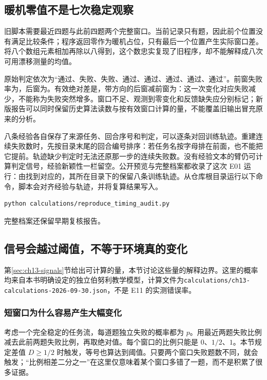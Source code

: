 \subsection{暖机零值不是七次稳定观察}

旧脚本需要最近四题与此前四题两个完整窗口。当前记录只有题，因此前个位置没有满足比较条件；程序返回零作为暖机占位，只有最后一个位置产生实际窗口差。将八个数组元素相加再除以八得到，这个数忠实复现了旧程序，却不能解释成八次可用漂移测量的均值。

原始判定依次为“通过、失败、失败、通过、通过、通过、通过、通过”。前窗失败率为，后窗为。有效绝对差是，带方向的后窗减前窗为：这一次变化对应失败减少，不能称为失败突然增多。窗口不足、观测到零变化和反馈缺失应分别标记；新版报告可以同时保留历史算法读数与按有效窗口计算的量，不能覆盖旧输出冒充原来的分析。

八条经验各自保存了来源任务、回合序号和判定，可以逐条对回训练轨迹。重建连续失败数时，先按目录末尾的回合编号排序：若任务名按字母排在前面，也不能把它提前。轨迹缺少判定时无法还原那一步的连续失败数。没有经验文本的臂仍可计算判定信号，经验新颖性一栏留空。公开预览与完整档案都收录了这次 E01 运行：由找到对应的，其所在目录下的保留八条训练轨迹。从仓库根目录运行以下命令，脚本会对齐经验与轨迹，并将复算结果写入。
\begin{verbatim}
python calculations/reproduce_timing_audit.py
\end{verbatim}
完整档案还保留早期复核报告。

\subsection{信号会越过阈值，不等于环境真的变化}
\label{sec:ch13-signal-noise}

第\ref{sec:ch13-signals}节给出可计算的量，本节讨论这些量的解释边界。这里的概率均来自本书明确设定的独立伯努利教学模型，计算文件为\nolinkurl{calculations/ch13-calculations-2026-09-30.json}，不是 E11 的实测错误率。

\subsubsection{短窗口为什么容易产生大幅变化}

考虑一个完全稳定的任务流，每道题独立失败的概率都为 $p$。用最近两题失败比例减去此前两题失败比例，再取绝对值。每个窗口的比例只能是 $0$、$1/2$、$1$。本节规定差值 $D\ge1/2$ 时触发，等号也算达到阈值。只要两个窗口失败题数不同，就会触发；“比例相差二分之一”在这里仅意味着某个窗口多错了一题，而不是积累了很多证据。

